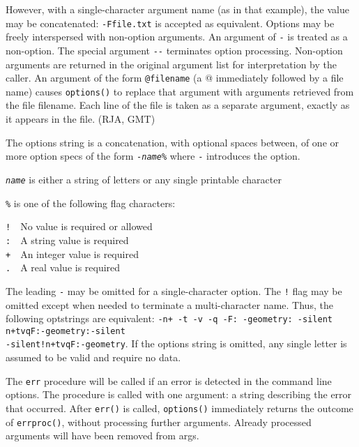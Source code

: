 However, with a single-character argument name (as in that example), the
value may be concatenated:
\texttt{{\textquotedbl}-Ffile.txt{\textquotedbl}} is accepted as
equivalent. Options may be freely interspersed with non-option
arguments. An argument of \texttt{{\textquotedbl}-{\textquotedbl}} is
treated as a non-option. The special argument
\texttt{{\textquotedbl}-{}-{\textquotedbl}} terminates option
processing. Non-option arguments are returned in the original argument
list for interpretation by the caller. An argument of the form
\texttt{@filename} (a {\textquotedbl}@{\textquotedbl} immediately
followed by a file name) causes \texttt{options()} to replace that
argument with arguments retrieved from the file
{\textquotedbl}filename{\textquotedbl}. Each line of the file is taken
as a separate argument, exactly as it appears in the file. (RJA, GMT)

The options string is a concatenation, with optional spaces between, of
one or more option specs of the form
\texttt{{}-}\texttt{\textit{name}}\texttt{\%} where \texttt{{}-}
introduces the option.

\texttt{\textit{name}} is either a string of letters or any single
printable character

\texttt{\%} is one of the following flag characters:

\texttt{!}\ \ No value is required or allowed\\
\texttt{:}\ \ A string value is required\\
\texttt{+}\ \ An integer value is required\\
\texttt{.}\ \ A real value is required

The leading \texttt{{\textquotedbl}-{\textquotedbl}} may be omitted for
a single-character option. The \texttt{{\textquotedbl}!{\textquotedbl}}
flag may be omitted except when needed to terminate a multi-character
name. Thus, the following optstrings are equivalent:
\texttt{{\textquotedbl}-n+ -t -v -q -F: -geometry:
-silent{\textquotedbl}}
\texttt{{\textquotedbl}n+tvqF:-geometry:-silent{\textquotedbl}}\\
\texttt{{\textquotedbl}-silent!n+tvqF:-geometry{\textquotedbl}}. If the
options string is omitted, any single letter is assumed to be valid and
require no data.

The \texttt{err} procedure will be called if an error is detected in the
command line options. The procedure is called with one argument: a
string describing the error that occurred. After \texttt{err()} is
called, \texttt{options()} immediately returns the outcome of
\texttt{errproc()}, without processing further arguments. Already
processed arguments will have been removed from args.

